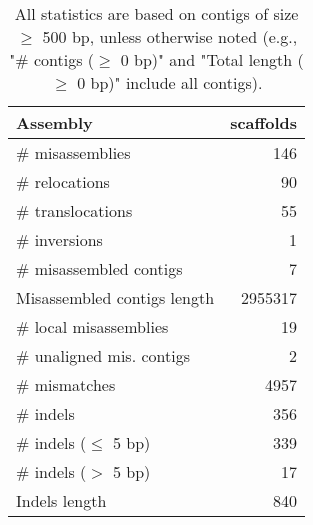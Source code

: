 \documentclass[12pt,a4paper]{article}
\begin{document}
\begin{table}[ht]
\begin{center}
\caption{All statistics are based on contigs of size $\geq$ 500 bp, unless otherwise noted (e.g., "\# contigs ($\geq$ 0 bp)" and "Total length ($\geq$ 0 bp)" include all contigs).}
\begin{tabular}{|l*{1}{|r}|}
\hline
Assembly & scaffolds \\ \hline
\# misassemblies & 146 \\ \hline
\hspace{5mm}\# relocations & 90 \\ \hline
\hspace{5mm}\# translocations & 55 \\ \hline
\hspace{5mm}\# inversions & 1 \\ \hline
\# misassembled contigs & 7 \\ \hline
Misassembled contigs length & 2955317 \\ \hline
\# local misassemblies & 19 \\ \hline
\# unaligned mis. contigs & 2 \\ \hline
\# mismatches & 4957 \\ \hline
\# indels & 356 \\ \hline
\hspace{5mm}\# indels ($\leq$ 5 bp) & 339 \\ \hline
\hspace{5mm}\# indels ($>$ 5 bp) & 17 \\ \hline
Indels length & 840 \\ \hline
\end{tabular}
\end{center}
\end{table}
\end{document}
